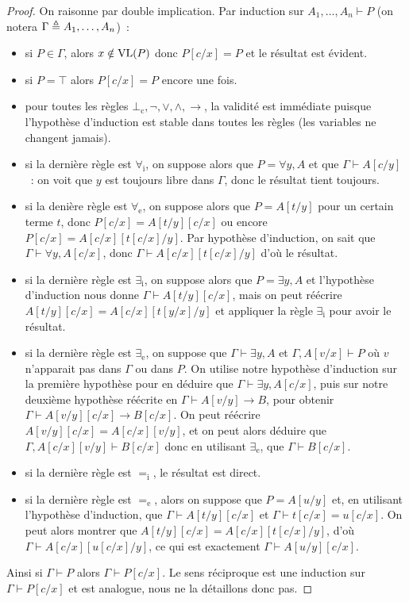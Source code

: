 \begin{proof}
  On raisonne par double implication. Par induction sur
  $A_1,\ldots,A_n\vdash P$ (on notera $\Gamma \triangleq A_1,\ldots,A_n$)~:
  \begin{itemize}
  \item si $P\in \Gamma$, alors $x\notin\operatorname{VL}(P)$ donc $P[c/x]=P$ et
    le résultat est évident.
  \item si $P = \top$ alors $P[c/x]=P$ encore une fois.
  \item pour toutes les règles $\bot_\mathrm c,\lnot,\lor,\land,\to$, la
    validité est immédiate puisque l'hypothèse d'induction est stable dans
    toutes les règles (les variables ne changent jamais).
  \item si la dernière règle est $\forall_\mathrm i$, on suppose alors que
    $P = \forall y, A$ et que $\Gamma\vdash A[c/y]$~: on voit que $y$ est
    toujours libre dans $\Gamma$, donc le résultat tient toujours.
  \item si la denière règle est $\forall_\mathrm e$, on suppose alors que
    $P = A[t/y]$ pour un certain terme $t$, donc $P[c/x] = A[t/y][c/x]$ ou
    encore $P[c/x] = A[c/x][t[c/x]/y]$. Par hypothèse d'induction, on sait que
    $\Gamma\vdash \forall y, A[c/x]$, donc $\Gamma\vdash A[c/x][t[c/x]/y]$
    d'où le résultat.
  \item si la dernière règle est $\exists_\mathrm i$, on suppose alors que
    $P = \exists y, A$ et l'hypothèse d'induction nous donne
    $\Gamma\vdash A[t/y][c/x]$, mais on peut réécrire
    $A[t/y][c/x] = A[c/x][t[y/x]/y]$ et appliquer la règle $\exists_\mathrm i$
    pour avoir le résultat.
  \item si la dernière règle est $\exists_\mathrm e$, on suppose que
    $\Gamma\vdash \exists y, A$ et $\Gamma, A[v/x]\vdash P$ où $v$ n'apparait
    pas dans $\Gamma$ ou dans $P$. On utilise notre hypothèse d'induction sur
    la première hypothèse pour en déduire que $\Gamma\vdash \exists y, A[c/x]$,
    puis sur notre deuxième hypothèse réécrite en $\Gamma\vdash A[v/y]\to B$,
    pour obtenir $\Gamma\vdash A[v/y][c/x]\to B[c/x]$. On peut réécrire
    $A[v/y][c/x] = A[c/x][v/y]$, et on peut alors déduire que
    $\Gamma,A[c/x][v/y]\vdash B[c/x]$ donc en utilisant $\exists_\mathrm e$, que
    $\Gamma\vdash B[c/x]$.
  \item si la dernière règle est $=_\mathrm i$, le résultat est direct.
  \item si la dernière règle est $=_\mathrm e$, alors on suppose que $P = A[u/y]$
    et, en utilisant l'hypothèse d'induction, que $\Gamma\vdash A[t/y][c/x]$
    et $\Gamma\vdash t[c/x] = u[c/x]$. On peut alors montrer que
    $A[t/y][c/x] = A[c/x][t[c/x]/y]$, d'où $\Gamma\vdash A[c/x][u[c/x]/y]$, ce
    qui est exactement $\Gamma\vdash A[u/y][c/x]$.
  \end{itemize}
  Ainsi si $\Gamma\vdash P$ alors $\Gamma\vdash P[c/x]$. Le sens réciproque est
  une induction sur $\Gamma\vdash P[c/x]$ et est analogue, nous ne la détaillons
  donc pas.
\end{proof}

